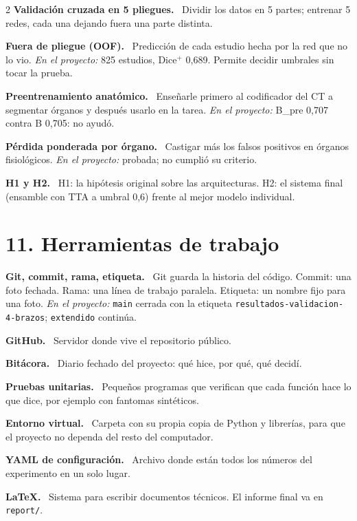 \documentclass[9pt,a4paper]{extarticle}
\newcommand{\T}[1]{{\sffamily\bfseries\color{tinta}#1.}\ }
\newcommand{\aqui}[1]{{\color{acento}\itshape En el proyecto:} #1}
\begin{document}
\begin{multicols}{2}
\T{Validación cruzada en 5 pliegues} Dividir los datos en 5 partes; entrenar 5 redes, cada una dejando fuera una parte distinta.

\T{Fuera de pliegue (OOF)} Predicción de cada estudio hecha por la red que no lo vio. \aqui{825 estudios, Dice$^{+}$ 0,689. Permite decidir umbrales sin tocar la prueba.}

\T{Preentrenamiento anatómico} Enseñarle primero al codificador del CT a segmentar órganos y después usarlo en la tarea. \aqui{B\_pre 0,707 contra B 0,705: no ayudó.}

\T{Pérdida ponderada por órgano} Castigar más los falsos positivos en órganos fisiológicos. \aqui{probada; no cumplió su criterio.}

\T{H1 y H2} H1: la hipótesis original sobre las arquitecturas. H2: el sistema final (ensamble con TTA a umbral 0,6) frente al mejor modelo individual.

\section{11. Herramientas de trabajo}

\T{Git, commit, rama, etiqueta} Git guarda la historia del código. Commit: una foto fechada. Rama: una línea de trabajo paralela. Etiqueta: un nombre fijo para una foto. \aqui{\texttt{main} cerrada con la etiqueta \texttt{resultados-validacion-4-brazos}; \texttt{extendido} continúa.}

\T{GitHub} Servidor donde vive el repositorio público.

\T{Bitácora} Diario fechado del proyecto: qué hice, por qué, qué decidí.

\T{Pruebas unitarias} Pequeños programas que verifican que cada función hace lo que dice, por ejemplo con fantomas sintéticos.

\T{Entorno virtual} Carpeta con su propia copia de Python y librerías, para que el proyecto no dependa del resto del computador.

\T{YAML de configuración} Archivo donde están todos los números del experimento en un solo lugar.

\T{LaTeX} Sistema para escribir documentos técnicos. El informe final va en \texttt{report/}.

\end{multicols}
\end{document}
